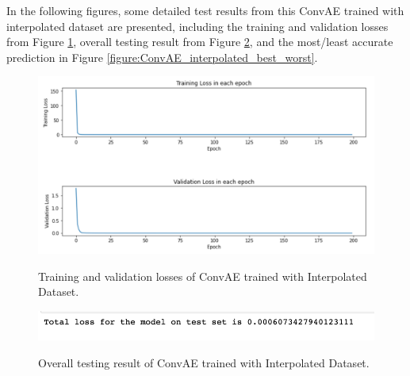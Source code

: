 In the following figures, some detailed test results from this ConvAE trained with interpolated dataset are presented, including the training and validation losses from Figure \ref{figure:ConvAE_interpolated_losses}, overall testing result from Figure \ref{figure:ConvAE_interpolated_testing}, and the most/least accurate prediction in Figure \ref{figure:ConvAE_interpolated_best_worst}.


\begin{figure}[H]
    \caption{Training and validation losses of ConvAE trained with Interpolated Dataset.}
    \includegraphics[scale=0.6]{figures/mantle_convection_images/larger_dataset_interpolated/ConvAE_trainingData.png}
    \label{figure:ConvAE_interpolated_losses}
\end{figure}

\begin{figure}[H]
    \caption{Overall testing result of ConvAE trained with Interpolated Dataset.}
    \includegraphics[scale=0.8]{figures/mantle_convection_images/larger_dataset_interpolated/ConvAE_OverallTesting.png}
    \label{figure:ConvAE_interpolated_testing}
\end{figure}


